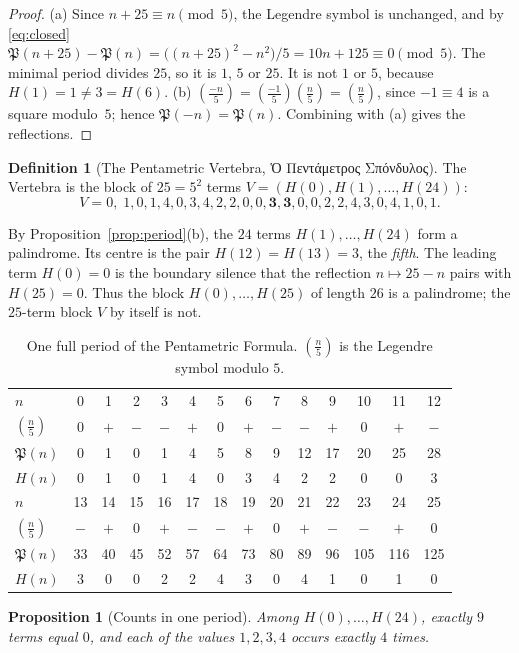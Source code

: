\documentclass[11pt,a4paper]{article}
\newcommand{\gr}[1]{{\greekfont #1}}                 %
\newcommand{\Pent}{\mathfrak{P}}                      %
\newcommand{\leg}[1]{\left(\tfrac{#1}{5}\right)}      %
\theoremstyle{plain}
\newtheorem{proposition}[theorem]{Proposition}
\theoremstyle{definition}
\newtheorem{definition}[theorem]{Definition}
\theoremstyle{remark}
\begin{document}
\begin{proof}
(a) Since $n+25\equiv n\pmod5$, the Legendre symbol is unchanged, and by \eqref{eq:closed}
$\Pent(n+25)-\Pent(n)=\bigl((n+25)^{2}-n^{2}\bigr)/5=10n+125\equiv0\pmod5$. The minimal period divides $25$, so it is $1$, $5$ or $25$. It is not $1$ or $5$, because $H(1)=1\neq3=H(6)$.
(b) $\leg{-n}=\leg{-1}\leg{n}=\leg{n}$, since $-1\equiv4$ is a square modulo~$5$; hence $\Pent(-n)=\Pent(n)$. Combining with (a) gives the reflections.
\end{proof}

\begin{definition}[The Pentametric Vertebra, \gr{Ὁ Πεντάμετρος Σπόνδυλος}]
The Vertebra is the block of $25=5^{2}$ terms $V=(H(0),H(1),\dots,H(24))$:
\[
V=0,\;1,0,1,4,0,3,4,2,2,0,0,\mathbf{3},\mathbf{3},0,0,2,2,4,3,0,4,1,0,1 .
\]
\end{definition}

By Proposition~\ref{prop:period}(b), the $24$ terms $H(1),\dots,H(24)$ form a palindrome. Its centre is the pair $H(12)=H(13)=3$, the \emph{fifth}. The leading term $H(0)=0$ is the boundary silence that the reflection $n\mapsto 25-n$ pairs with $H(25)=0$. Thus the block $H(0),\dots,H(25)$ of length $26$ is a palindrome; the $25$-term block $V$ by itself is not.

\begin{table}[ht]
\centering\small
\caption{One full period of the Pentametric Formula. $\leg{n}$ is the Legendre symbol modulo $5$.}\label{tab:period}
\setlength{\tabcolsep}{3.2pt}
\begin{tabular}{@{}l*{13}{c}@{}}
\toprule
$n$ & 0&1&2&3&4&5&6&7&8&9&10&11&12\\
$\leg{n}$ & 0&$+$&$-$&$-$&$+$&0&$+$&$-$&$-$&$+$&0&$+$&$-$\\
$\Pent(n)$ & 0&1&0&1&4&5&8&9&12&17&20&25&28\\
$H(n)$ & 0&1&0&1&4&0&3&4&2&2&0&0&3\\
\midrule
$n$ & 13&14&15&16&17&18&19&20&21&22&23&24&25\\
$\leg{n}$ & $-$&$+$&0&$+$&$-$&$-$&$+$&0&$+$&$-$&$-$&$+$&0\\
$\Pent(n)$ & 33&40&45&52&57&64&73&80&89&96&105&116&125\\
$H(n)$ & 3&0&0&2&2&4&3&0&4&1&0&1&0\\
\bottomrule
\end{tabular}
\end{table}

\begin{proposition}[Counts in one period]\label{prop:counts}
Among $H(0),\dots,H(24)$, exactly $9$ terms equal $0$, and each of the values $1,2,3,4$ occurs exactly $4$ times.
\end{proposition}
\end{document}
